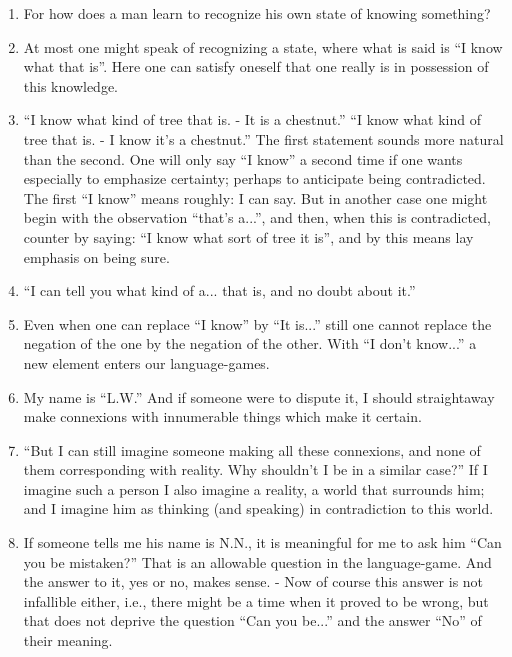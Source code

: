 \documentclass{book}
\begin{document}
\begin{enumerate}
\item
For how does a man learn to recognize his own state of knowing something?

\item
At most one might speak of recognizing a state, where what is said is ``I know
what that is''. Here one can satisfy oneself that one really is in possession
of this knowledge.

\item
``I know what kind of tree that is. - It is a chestnut.'' ``I know what kind of
tree that is. - I know it's a chestnut.'' The first statement sounds more
natural than the second. One will only say ``I know'' a second time if one
wants especially to emphasize certainty; perhaps to anticipate being
contradicted. The first ``I know'' means roughly: I can say.  But in another
case one might begin with the observation ``that's a...'', and then, when this
is contradicted, counter by saying: ``I know what sort of tree it is'', and by
this means lay emphasis on being sure.

\item
``I can tell you what kind of a... that is, and no doubt about it.''

\item
Even when one can replace ``I know'' by ``It is...'' still one cannot replace
the negation of the one by the negation of the other.  With ``I don't know...''
a new element enters our language-games.

\item
My name is ``L.W.'' And if someone were to dispute it, I should straightaway
make connexions with innumerable things which make it certain.

\item
``But I can still imagine someone making all these connexions, and none of them
corresponding with reality. Why shouldn't I be in a similar case?'' If I
imagine such a person I also imagine a reality, a world that surrounds him; and
I imagine him as thinking (and speaking) in contradiction to this world.

\item
If someone tells me his name is N.N., it is meaningful for me to ask him ``Can
you be mistaken?'' That is an allowable question in the language-game. And the
answer to it, yes or no, makes sense. - Now of course this answer is not
infallible either, i.e., there might be a time when it proved to be wrong, but
that does not deprive the question ``Can you be...'' and the answer ``No'' of
their meaning.


\end{enumerate}
\end{document}

